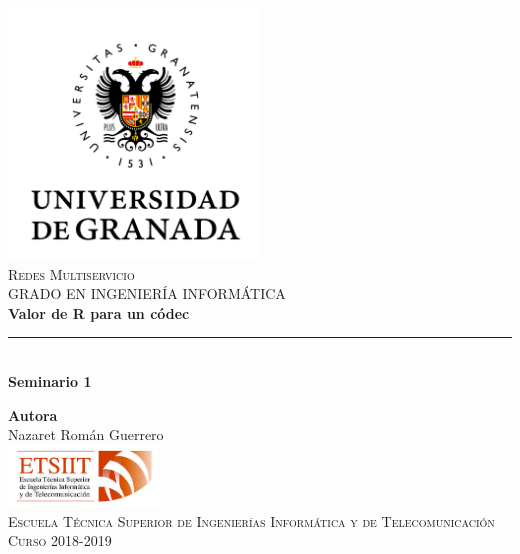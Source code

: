 \documentclass[11pt,a4paper]{article}
\begin{document}
\begin{titlepage}

\begin{minipage}{\textwidth}

\centering
\includegraphics[width=0.5\textwidth]{img/logo.png}\\

\textsc{\Large Redes Multiservicio\\[0.2cm]}
\textsc{GRADO EN INGENIERÍA INFORMÁTICA}\\[1cm]

{\Huge\bfseries Valor de R para un códec\\}
\noindent\rule[-1ex]{\textwidth}{3pt}\\[3.5ex]
{\large\bfseries Seminario 1}
\end{minipage}

\vspace{1.5cm}
\begin{minipage}{\textwidth}
\centering

\textbf{Autora}\\ {Nazaret Román Guerrero}\\[2.5ex]
\includegraphics[width=0.3\textwidth]{img/etsiit.jpeg}\\[0.1cm]
\vspace{1cm}
\textsc{Escuela Técnica Superior de Ingenierías Informática y de Telecomunicación}\\
\vspace{1cm}
\textsc{Curso 2018-2019}
\end{minipage}
\end{titlepage}

\end{document}
